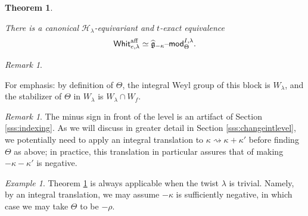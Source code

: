 \documentclass[11pt,reqno]{amsart}
\newcommand{\sH}{\mathscr{H}}
\newcommand{\aff}{\operatorname{aff}}
\newcommand{\fg}{\mathfrak{g}}
\newtheorem{theo}[subsubsection]{Theorem}
\theoremstyle{remark}
\newtheorem{re}[subsubsection]{Remark}
\newtheorem{example}[subsubsection]{Example}
\numberwithin{equation}{section}
\newcommand{\gmk}{\widehat{\fg}_{-\kappa}}
\renewcommand{\mod}{\text{\textendash}\mathsf{mod}}
\newcommand{\Whit}{\mathsf{Whit}}
\begin{document}
\begin{theo}\label{t:whit-km-neut}

There is a canonical $\sH_\lambda$-equivariant and $t$-exact 
equivalence
%
\begin{equation} \label{e:whit2kac}
 \Whit_{e, \lambda}^{\aff} \simeq \gmk\mod^{I, \lambda}_\Theta.
\end{equation}
%
\end{theo}

\begin{re}\label{r:sf-1}

For emphasis: by definition of $\Theta$, the integral Weyl group of this block
is $W_{\lambda}$, and the stabilizer of $\Theta$ in $W_{\lambda}$ is
$W_{\lambda} \cap W_f$.

\end{re}

\begin{re}

The minus sign in front of the level is an artifact of 
Section \ref{sss:indexing}. As we will discuss in greater detail in Section 
\ref{sss:changeintlevel}, we potentially 
need to apply an integral
translation to $\kappa \rightsquigarrow \kappa+\kappa'$ 
before finding $\Theta$ as above; in practice, this translation 
in particular assures that
of making $-\kappa-\kappa'$ is negative.

\end{re}

\begin{example} Theorem \ref{t:whit-km-neut} is always applicable when the 
twist $\lambda$ is trivial. Namely, by an integral translation, we may assume 
$-\kappa$ is sufficiently negative, in which case we may take $\Theta$ to be  
$- 
\rho$. 
\end{example}
\end{document}
